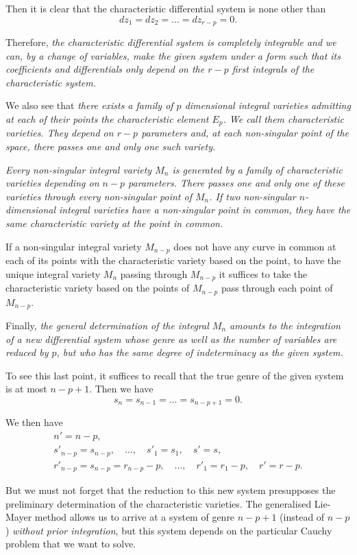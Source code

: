 \documentclass[leqno,11pt]{book}
\theoremstyle{shape1}
\theoremstyle{shapesmall}
\begin{document}
Then it is clear that the characteristic differential system is none other than
\[
dz_{1}=dz_{2}=\dots=dz_{r-p}=0.
\] 

Therefore, \emph{the characteristic differential system is completely integrable and we can, by a change of variables, make the given system under a form such that its coefficients and differentials only depend on the $r-p$ first integrals of the characteristic system.}

We also see that \emph{there exists a family of $p$ dimensional integral varieties admitting at each of their points the characteristic element $E_{p}$. We call them \emph{characteristic varieties}. They depend on $r-p$ parameters and, at each non-singular point of the space, there passes one and only one such variety.}

\emph{Every non-singular integral variety $M_{n}$ is generated by a family of characteristic varieties depending on $n-p$ parameters. There passes one and only one of these varieties through every non-singular point of $M_{n}$. If two non-singular $n$-dimensional integral varieties have a non-singular point in common, they have the same characteristic variety at the point in common.}

If a non-singular integral variety $M_{n-p}$ does not have any curve in common at each of its points with the characteristic variety based on the point, to have the unique integral variety $M_{n}$ passing through $M_{n-p}$ it suffices to take the characteristic variety based on the points of $M_{n-p}$ pass through each point of $M_{n-p}$.

Finally, \emph{the general determination of the integral $M_{n}$ amounts to the integration of a new differential system whose genre as well as the number of variables are reduced by $p$, but who has the same degree of indeterminacy as the given system.}

To see this last point, it suffices to recall that the true genre of the given system is at most $n-p+1$. Then we have
\[
s_{n}=s_{n-1}=\dots=s_{n-p+1}=0.
\]

We then have
\begin{gather*}
  n'=n-p,\\
  s'_{n-p}=s_{n-p},\quad\dots,\quad s'_{1}=s_{1},\quad s'=s,\\
  r'_{n-p}=s_{n-p}=r_{n-p}-p,\quad\dots,\quad r'_{1}=r_{1}-p,\quad r'=r-p.
\end{gather*}

But we must not forget that the reduction to this new system presupposes the preliminary determination of the characteristic varieties. The generalised Lie-Mayer method allows us to arrive at a system of genre $n-p+1$ (instead of $n-p$) \emph{without prior integration}, but this system depends on the particular Cauchy problem that we want to solve.
\end{document}
